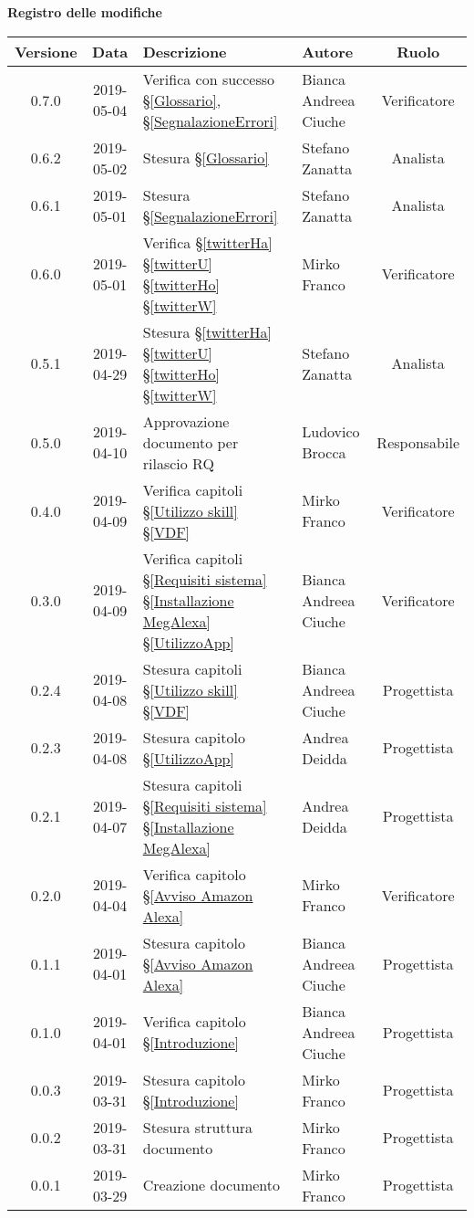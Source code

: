 	\begin{center}
		\textbf{Registro delle modifiche}
	\end{center}
	\begin{center}
		\begin{tabularx}{\textwidth}{|c|c|X|X|c|}
			\hline
			\textbf{Versione} & \textbf{Data} & \textbf{Descrizione} & \textbf{Autore} & \textbf{Ruolo} \\
			\hline
		    0.7.0 & 2019-05-04& Verifica con successo \S\ref{Glossario}, \S\ref{SegnalazioneErrori}  &Bianca Andreea Ciuche &Verificatore\\
			\hline
			0.6.2 & 2019-05-02& Stesura \S\ref{Glossario} & Stefano Zanatta & Analista \\
			\hline
			0.6.1 & 2019-05-01& Stesura \S\ref{SegnalazioneErrori}& Stefano Zanatta & Analista \\
			\hline
		    0.6.0 & 2019-05-01& Verifica  \S\ref{twitterHa} \S\ref{twitterU} \S\ref{twitterHo} \S\ref{twitterW}& Mirko Franco  & Verificatore \\
			\hline
			0.5.1 & 2019-04-29& Stesura \S\ref{twitterHa} \S\ref{twitterU} \S\ref{twitterHo} \S\ref{twitterW} & Stefano Zanatta & Analista \\
			\hline
			0.5.0 & 2019-04-10& Approvazione documento per rilascio RQ & Ludovico Brocca & Responsabile \\
			\hline
			0.4.0 & 2019-04-09& Verifica capitoli \S\ref{Utilizzo skill}  \S\ref{VDF}  & Mirko Franco & Verificatore \\
			\hline
			0.3.0 & 2019-04-09 & Verifica capitoli \S\ref{Requisiti sistema}  \S\ref{Installazione MegAlexa}  \S\ref{UtilizzoApp}  & Bianca Andreea Ciuche & Verificatore \\
			\hline
			0.2.4 & 2019-04-08 & Stesura capitoli \S\ref{Utilizzo skill}  \S\ref{VDF}  & Bianca Andreea Ciuche & Progettista \\
			\hline
			0.2.3 & 2019-04-08 & Stesura capitolo \S\ref{UtilizzoApp} & Andrea Deidda & Progettista \\
			\hline
			0.2.1 & 2019-04-07 & Stesura capitoli \S\ref{Requisiti sistema}  \S\ref{Installazione MegAlexa}  & Andrea Deidda & Progettista \\
			\hline
			0.2.0 & 2019-04-04 &Verifica capitolo \S\ref{Avviso Amazon Alexa} & Mirko Franco  & Verificatore\\
			\hline
			0.1.1 & 2019-04-01 &Stesura capitolo \S\ref{Avviso Amazon Alexa} & Bianca Andreea Ciuche & Progettista \\
			\hline
			0.1.0 & 2019-04-01 & Verifica capitolo \S\ref{Introduzione} & Bianca Andreea Ciuche & Progettista \\
			\hline
			0.0.3 & 2019-03-31 & Stesura capitolo \S\ref{Introduzione} & Mirko Franco &  Progettista\\
			\hline
			0.0.2 & 2019-03-31 & Stesura struttura documento & Mirko Franco &  Progettista\\
			\hline
			0.0.1 & 2019-03-29 & Creazione documento & Mirko Franco & Progettista\\
			\hline
		\end{tabularx}
	\end{center}
\newpage